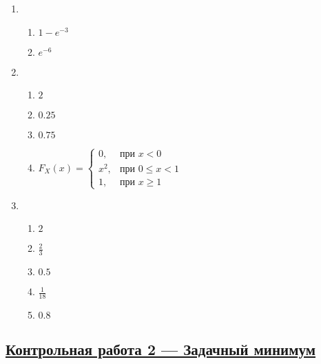 \begin{multicols}{2}
\begin{enumerate}
	\item %
	\begin{enumerate}
		\item $1 - e^{-3}$
		\item $e^{-6}$
	\end{enumerate}
	\item %
	\begin{enumerate}
		\item $2$
		\item $0.25$
		\item $0.75$
		\item
		$F_{X}(x) = \begin{cases}
		0, & \text{при } x < 0 \\
		x^2 , & \text{при } 0 \le x < 1 \\
		1, & \text{при }  x \geq 1
		\end{cases}$
	\end{enumerate}
	\item %
	\begin{enumerate}
		\item $2$
		\item $\frac{2}{3}$
		\item $0.5$
		\item $\frac{1}{18}$
		\item $0.8$
	\end{enumerate}
\end{enumerate}
\end{multicols}


\subsection[Кр 2]{\hyperref[sec:minimum_kr_02]{Контрольная работа 2 — Задачный минимум}}
\label{sec:sol_minimum_kr_02}


